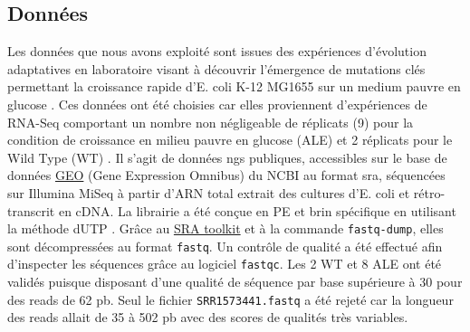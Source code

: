 \documentclass[12pt,a4paper]{report}
\begin{document}
\begin{onehalfspace}
\section*{Données}
Les données que nous avons exploité sont issues des expériences d'évolution adaptatives en laboratoire visant à découvrir l'émergence de mutations clés permettant la croissance rapide d'E. coli K-12 MG1655 sur un medium pauvre en glucose \citep{Lacroix2014}. Ces données ont été choisies car elles proviennent d'expériences de RNA-Seq comportant un nombre non négligeable de réplicats (9) pour la condition de croissance en milieu pauvre en glucose (ALE) et 2 réplicats pour le Wild Type (WT) . Il s'agit de données \gls{ngs} publiques, accessibles sur le base de données \href{http://www.ncbi.nlm.nih.gov/geo/query/acc.cgi?acc=GSE61327}{GEO} (Gene Expression Omnibus) du NCBI au format \gls{sra}, séquencées sur Illumina MiSeq à partir d'ARN total extrait des cultures d'E. coli et rétro-transcrit en cDNA. La librairie a été conçue en \gls{PE} et brin spécifique en utilisant la méthode dUTP \citep{Levin2010}. Grâce au \href{http://www.ncbi.nlm.nih.gov/books/NBK158900/#SRA_download.how_do_i_use_the_sra_toolki}{SRA toolkit} et à la commande \texttt{fastq-dump}, elles sont décompressées au format \texttt{fastq}. Un contrôle de qualité a été effectué afin d'inspecter les séquences grâce au logiciel \texttt{fastqc}. Les 2 WT et 8 ALE ont été validés puisque disposant d'une qualité de séquence par base supérieure à 30 pour des \gls{reads} de 62 pb. Seul le fichier \texttt{SRR1573441.fastq} a été rejeté car la longueur des reads allait de 35 à 502 pb avec des scores de qualités très variables.


\end{onehalfspace}
\end{document}
